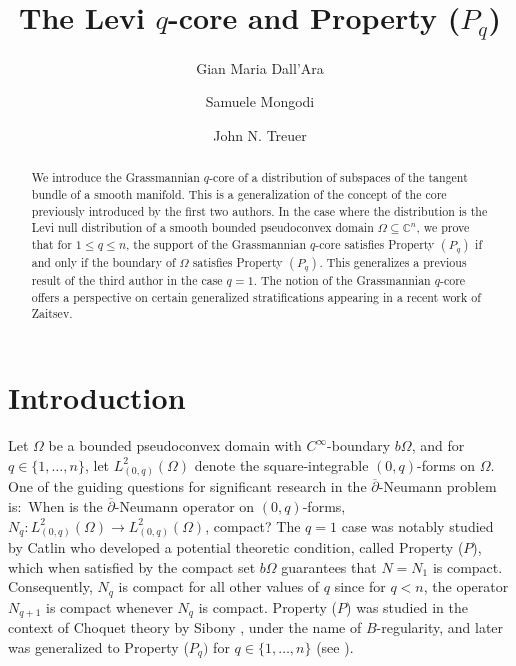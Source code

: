 \documentclass[12pt]{amsart}
\title{The Levi $q$-core and Property ($P_q$)}
\author{Gian Maria Dall'Ara}
\author{Samuele Mongodi}
\author{John N. Treuer}
\numberwithin{equation}{section}
{\theoremstyle{definition}
\newtheorem{remark}[theorem]{Remark}
}
\begin{document}
\maketitle

\begin{abstract}
We introduce the Grassmannian $q$-core of a distribution of subspaces of the tangent bundle of a smooth manifold. This is a generalization of the concept of the core previously introduced by the first two authors. In the case where the distribution is the Levi null distribution of a smooth bounded pseudoconvex domain $\Omega\subseteq \mathbb{C}^n$, we prove that for $1 \leq q \leq n$, the support of the Grassmannian $q$-core satisfies Property $(P_q)$ if and only if the boundary of $\Omega$ satisfies Property $(P_q)$. This generalizes a previous result of the third author in the case $q=1$. The notion of the Grassmannian $q$-core offers a perspective on certain generalized stratifications appearing in a recent work of Zaitsev.
\end{abstract}

\renewcommand{\thefootnote}{\fnsymbol{footnote}}


\section{Introduction}
Let $\Omega$ be a bounded pseudoconvex domain with $C^{\infty}$-boundary $b\Omega$, and for $q \in \{1, \ldots, n\}$, let $L^2_{(0, q)}(\Omega)$ denote the square-integrable $(0, q)$-forms on $\Omega$.  One of the guiding questions for significant research in the $\overline{\partial}$-Neumann problem is:~When is the $\overline{\partial}$-Neumann operator on $(0, q)$-forms, $N_q:L^2_{(0, q)}(\Omega) \to L^2_{(0, q)}(\Omega)$, compact?  The $q = 1$ case was notably studied by Catlin \cite{Cat84} who developed a potential theoretic condition, called Property ($P$), which when satisfied by the compact set $b\Omega$ guarantees that $N = N_1$ is compact. Consequently, $N_q$ is compact for all other values of $q$ since for $q < n$, the operator $N_{q + 1}$ is compact whenever $N_q$ is compact.  Property ($P$) was studied in the context of Choquet theory by Sibony \cite{Si87}, under the name of $B$-regularity, and later was generalized to Property ($P_q)$ for $q \in \{1,\ldots, n\}$ (see \cite{FuSt01}).
\end{document}
